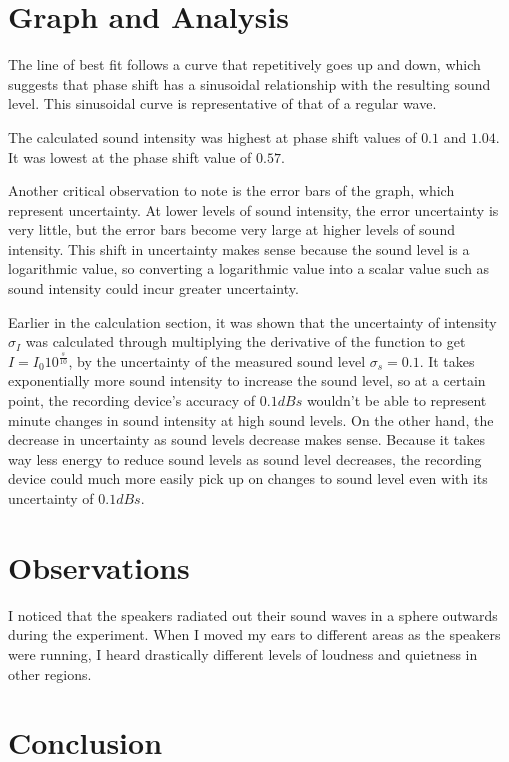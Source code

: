 \documentclass[index]{subfiles}
\begin{document}
\section{Graph and Analysis}

The line of best fit follows a curve that repetitively goes up and down, which suggests that phase shift has a sinusoidal relationship with the resulting sound level. This sinusoidal curve is representative of that of a regular wave. 

The calculated sound intensity was highest at phase shift values of \(0.1\) and \(1.04\). It was lowest at the phase shift value of \(0.57\).

Another critical observation to note is the error bars of the graph, which represent uncertainty. At lower levels of sound intensity, the error uncertainty is very little, but the error bars become very large at higher levels of sound intensity. This shift in uncertainty makes sense because the sound level is a logarithmic value, so converting a logarithmic value into a scalar value such as sound intensity could incur greater uncertainty.

Earlier in the calculation section, it was shown that the uncertainty of intensity \(\sigma_{I}\) was calculated through multiplying the derivative of the function to get \(I=I_{0}10^{\frac{s}{10}}\), by the uncertainty of the measured sound level \(\sigma_{s}=0.1\). It takes exponentially more sound intensity to increase the sound level, so at a certain point, the recording device's accuracy of \(0.1 dBs\) wouldn't be able to represent minute changes in sound intensity at high sound levels. On the other hand, the decrease in uncertainty as sound levels decrease makes sense. Because it takes way less energy to reduce sound levels as sound level decreases, the recording device could much more easily pick up on changes to sound level even with its uncertainty of \(0.1 dBs\).



\section{Observations}

I noticed that the speakers radiated out their sound waves in a sphere outwards during the experiment. When I moved my ears to different areas as the speakers were running, I heard drastically different levels of loudness and quietness in other regions.

\section{Conclusion}
\end{document}
